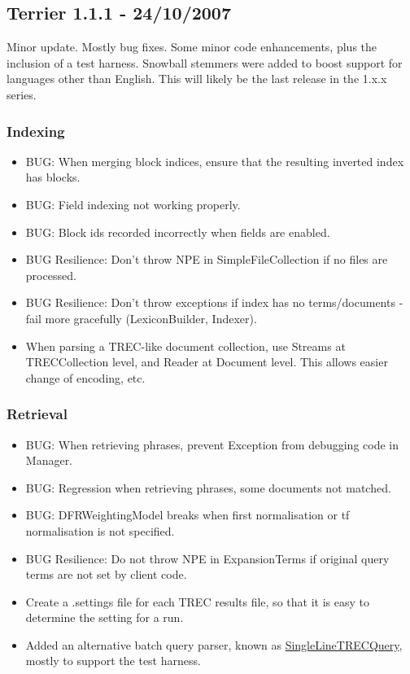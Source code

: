 \subsection{Terrier 1.1.1 - 24/10/2007}\label{terrier-1.1.1---24102007}

Minor update. Mostly bug fixes. Some minor code enhancements, plus the
inclusion of a test harness. Snowball stemmers were added to boost
support for languages other than English. This will likely be the last
release in the 1.x.x series.

\subsubsection{Indexing}\label{indexing-8}

\begin{itemize}
\tightlist
\item
  BUG: When merging block indices, ensure that the resulting inverted
  index has blocks.
\item
  BUG: Field indexing not working properly.
\item
  BUG: Block ids recorded incorrectly when fields are enabled.
\item
  BUG Resilience: Don't throw NPE in SimpleFileCollection if no files
  are processed.
\item
  BUG Resilience: Don't throw exceptions if index has no terms/documents
  - fail more gracefully (LexiconBuilder, Indexer).
\item
  When parsing a TREC-like document collection, use Streams at
  TRECCollection level, and Reader at Document level. This allows easier
  change of encoding, etc.
\end{itemize}

\subsubsection{Retrieval}\label{retrieval-8}

\begin{itemize}
\tightlist
\item
  BUG: When retrieving phrases, prevent Exception from debugging code in
  Manager.
\item
  BUG: Regression when retrieving phrases, some documents not matched.
\item
  BUG: DFRWeightingModel breaks when first normalisation or tf
  normalisation is not specified.
\item
  BUG Resilience: Do not throw NPE in ExpansionTerms if original query
  terms are not set by client code.
\item
  Create a .settings file for each TREC results file, so that it is easy
  to determine the setting for a run.
\item
  Added an alternative batch query parser, known as
  \href{javadoc/org/terrier/structures/SingleLineTRECQuery.html}{SingleLineTRECQuery},
  mostly to support the test harness.
\end{itemize}

